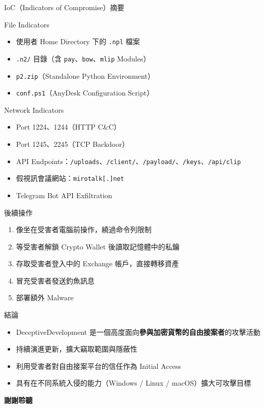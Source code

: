 \documentclass{beamer}
\begin{document}
\begin{frame}{IoC（Indicators of Compromise）摘要}
  \begin{block}{File Indicators}
    \begin{itemize}
      \item 使用者 Home Directory 下的 \texttt{.npl} 檔案
      \item \texttt{.n2/} 目錄（含 \texttt{pay}、\texttt{bow}、\texttt{mlip} Modules）
      \item \texttt{p2.zip}（Standalone Python Environment）
      \item \texttt{conf.ps1}（AnyDesk Configuration Script）
    \end{itemize}
  \end{block}

  \begin{block}{Network Indicators}
    \begin{itemize}
      \item Port 1224、1244（HTTP C\&C）
      \item Port 1245、2245（TCP Backdoor）
      \item API Endpoints：\texttt{/uploads}、\texttt{/client/}、\texttt{/payload/}、\texttt{/keys}、\texttt{/api/clip}
      \item 假視訊會議網站：\texttt{mirotalk[.]net}
      \item Telegram Bot API Exfiltration
    \end{itemize}
  \end{block}
\end{frame}


\begin{frame}{後續操作}
  \begin{enumerate}
    \item 像坐在受害者電腦前操作，繞過命令列限制
    \item 等受害者解鎖 Crypto Wallet 後讀取記憶體中的私鑰
    \item 存取受害者登入中的 Exchange 帳戶，直接轉移資產
    \item 冒充受害者發送釣魚訊息
    \item 部署額外 Malware
  \end{enumerate}
\end{frame}

\begin{frame}{結論}
  \begin{itemize}
    \item DeceptiveDevelopment 是一個高度面向\textbf{參與加密貨幣的自由接案者}的攻擊活動
    \item 持續演進更新，擴大竊取範圍與隱蔽性
    \item 利用受害者對自由接案平台的信任作為 Initial Access
    \item 具有在不同系統入侵的能力（Windows / Linux / macOS）擴大可攻擊目標
  \end{itemize}

  \vspace{0.5cm}
  \begin{center}
    \large\textbf{謝謝聆聽}
  \end{center}
\end{frame}
\end{document}
